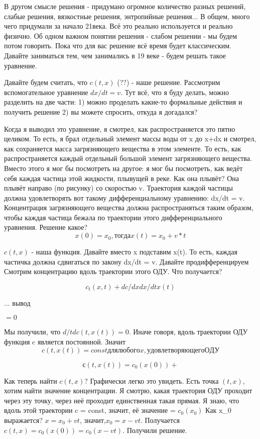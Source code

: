 В другом смысле решения - придумано огромное количество разных решений, слабые решения, вязкостные решения, энтропийные решения... В общем, много чего придумали за начало 21века. Всё это реально используется и реально физично.
Об одном важном понятии решения - слабом решении - мы будем потом говорить. Пока что для вас решение всё время будет классическим. Давайте заниматься тем, чем занимались в 19 веке - будем решать такое уравнение.

Давайте будем считать, что $c(t,x)$ (??) - наше решение. Рассмотрим вспомогательное уравнение $dx/dt = v$. Тут всё, что я буду делать, можно разделить на две части:
1) можно проделать какие-то формальные действия и получить решение
2) вы можете спросить, откуда я догадался?

Когда я выводил это уравнение, я смотрел, как распространяется это пятно целиком. То есть, я брал отдельный элемент массы воды от x до x+dx и смотрел, как сохраняется масса загрязняющего вещества в этом элементе. То есть, как распространяется каждый отдельный большой элемент загрязняющего вещества. Вместо этого я мог бы посмотреть на другое: я мог бы посмотреть, как ведёт себя каждая частица этой жидкости, плывущей в реке. Как она плывёт? Она плывёт направо (по рисунку) со скоростью v. Траектория каждой частицы должна удовлетворять вот такому дифференциальному уравнению: dx/dt = v. Концентрация загрязняющего вещества должна распространяться таким образом, чтобы каждая частица бежала по траектории этого дифференциального уравнения.
Решение какое?
$$x(0) = x_0, тогда x(t) = x_0 + v * t$$

$c(t,x)$ - наша функция. Давайте вместо x подставим x(t). То есть, каждая частичка должна сдвигаться по закону dx/dt = v. Давайте продифференцируем %
Смотрим концентрацию вдоль траектории этого ОДУ. Что получается?

$$c_t(x,t) + dc/dx dx/dt x(t)$$ %

... вывод

$ = 0$

Мы получили, что $d/td c(t,x(t)) = 0$. Иначе говоря, вдоль траектории ОДУ функция c является постоянной.
Значит
$$c(t,x(t)) = const для любого x, удовлетворяющего ОДУ$$

$$с(t,x(t)) = c_0(x(0)) + $$

Как теперь найти $c(t,x)$? Графически легко это увидеть.
Есть точка $(t,x)$, хотим найти значение концентрации. Я смотрю, какая траектория ОДУ проходит через эту точку, через неё проходит единственная такая прямая. Я знаю, что вдоль этой траектории c = const, значит, её значение = $c_0(x_0)$
Как x_0 выражается? $x = x_0 + vt$, значит,$ x_0 = x - vt$.
Получается $c(t,x) = c_0(x(0)) = c_0(x-vt)$. Получили решение.

